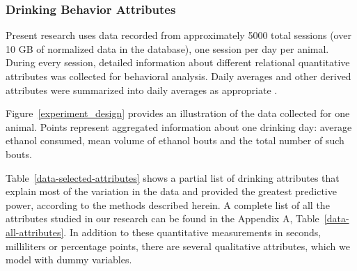 		\subsubsection{Drinking Behavior Attributes}
		Present research uses data recorded from approximately 5000 total sessions (over 10 GB of normalized data in the database), one session per day per animal. During every session, detailed information about different relational quantitative attributes was collected for behavioral analysis. Daily averages and other derived attributes were summarized into daily averages as appropriate .
		
		Figure~\ref{experiment_design} provides an illustration of the data collected for one animal. Points represent aggregated information about one drinking day: average ethanol consumed, mean volume of ethanol bouts and the total number of such bouts.
		
		Table~\ref{data-selected-attributes} shows a partial list of drinking attributes that explain most of the variation in the data and provided the greatest predictive power, according to the methods described herein. A complete list of all the attributes studied in our research can be found in the Appendix A, Table~\ref{data-all-attributes}. In addition to these quantitative measurements in seconds, milliliters or percentage points, there are several qualitative attributes, which we model with dummy variables.
		
